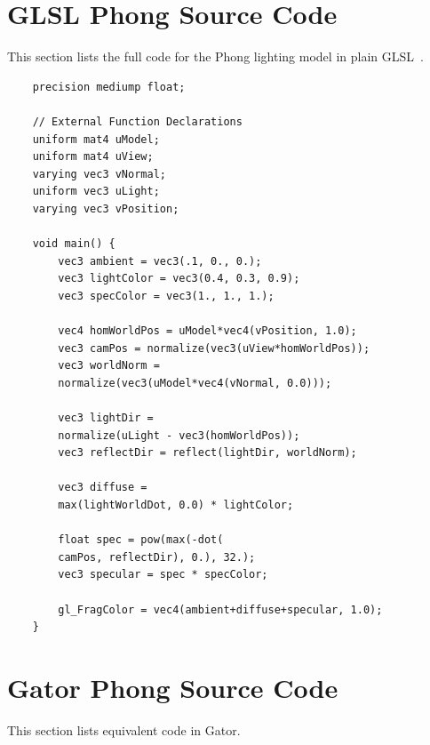 \section{GLSL Phong Source Code}
\label{app:llphong}

This section lists the full code for the Phong lighting model in plain GLSL~\cite{glsl}.

\begin{verbatim}
	precision mediump float;
	
	// External Function Declarations
	uniform mat4 uModel;
	uniform mat4 uView;
	varying vec3 vNormal;
	uniform vec3 uLight;
	varying vec3 vPosition;
	
	void main() {
		vec3 ambient = vec3(.1, 0., 0.);
		vec3 lightColor = vec3(0.4, 0.3, 0.9);
		vec3 specColor = vec3(1., 1., 1.);
		
		vec4 homWorldPos = uModel*vec4(vPosition, 1.0);
		vec3 camPos = normalize(vec3(uView*homWorldPos));
		vec3 worldNorm = 
		normalize(vec3(uModel*vec4(vNormal, 0.0)));
		
		vec3 lightDir = 
		normalize(uLight - vec3(homWorldPos));
		vec3 reflectDir = reflect(lightDir, worldNorm);
		
		vec3 diffuse = 
		max(lightWorldDot, 0.0) * lightColor;
		
		float spec = pow(max(-dot(
		camPos, reflectDir), 0.), 32.);
		vec3 specular = spec * specColor;
		
		gl_FragColor = vec4(ambient+diffuse+specular, 1.0);
	}
\end{verbatim}

\section{Gator Phong Source Code}
\label{app:hlphong}

This section lists equivalent code in Gator.

